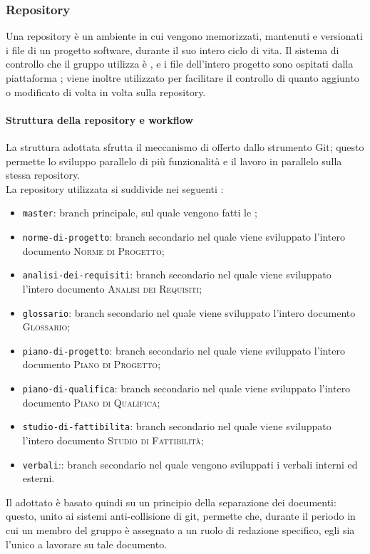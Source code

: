 \documentclass[../norme-di-progetto.tex]{subfiles}
\begin{document}
\subsubsection{Repository}
Una repository è un ambiente in cui vengono memorizzati, mantenuti e versionati i file di un progetto software, durante il suo intero ciclo di vita. Il sistema di controllo che il gruppo utilizza è , e i file dell'intero progetto sono ospitati dalla piattaforma ; viene inoltre utilizzato  per facilitare il controllo di quanto aggiunto o modificato di volta in volta sulla repository.

\paragraph{Struttura della repository e workflow}
La struttura adottata sfrutta il meccanismo di  offerto dallo strumento Git; questo permette lo sviluppo parallelo di più funzionalità e il lavoro in parallelo sulla stessa repository. \\
La repository utilizzata si suddivide nei seguenti :
\begin{itemize}
  \item \texttt{master}: branch principale, sul quale vengono fatti le ;
  \item \texttt{norme-di-progetto}: branch secondario nel quale viene sviluppato l'intero documento \textsc{Norme di Progetto};
  \item \texttt{analisi-dei-requisiti}: branch secondario nel quale viene sviluppato l'intero documento \textsc{Analisi dei Requisiti};
  \item \texttt{glossario}: branch secondario nel quale viene sviluppato l'intero documento \textsc{Glossario};
  \item \texttt{piano-di-progetto}: branch secondario nel quale viene sviluppato l'intero documento \textsc{Piano di Progetto};
  \item \texttt{piano-di-qualifica}: branch secondario nel quale viene sviluppato l'intero documento \textsc{Piano di Qualifica};
  \item \texttt{studio-di-fattibilita}: branch secondario nel quale viene sviluppato l'intero documento \textsc{Studio di Fattibilità};
  \item \texttt{verbali}:: branch secondario nel quale vengono sviluppati i verbali interni ed esterni.
\end{itemize}
Il  adottato è basato quindi su un principio della separazione dei documenti: questo, unito ai sistemi anti-collisione di git, permette che, durante il periodo in cui un membro del gruppo è assegnato a un ruolo di redazione specifico, egli sia l'unico a lavorare su tale documento.
\end{document}
